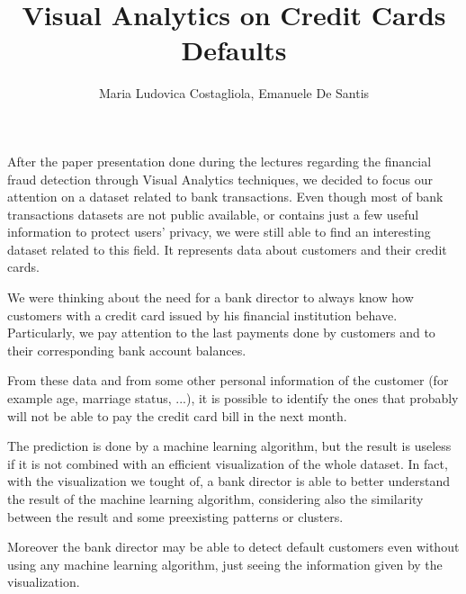 \documentclass[journal]{vgtc}                %
\title{Visual Analytics on Credit Cards Defaults}
\author{Maria Ludovica Costagliola, Emanuele De Santis}
\begin{document}


\maketitle


After the paper presentation done during the lectures regarding the financial
fraud detection through Visual Analytics techniques, we decided to
focus our attention on a dataset related to bank transactions.
Even though most of bank transactions datasets are not public available,
or contains just a few useful information to protect users’ privacy, we were still
able to find an interesting dataset related to this field. It represents
data about customers and their credit cards.

We were thinking about the need for a bank director to always know
how customers with a credit card issued by his financial institution
behave. Particularly, we pay attention to the last payments done by customers
and to their corresponding bank account balances.

From these data and from some other personal information of the customer (for example age, marriage status, ...), it is possible to identify the ones that probably will not be able
to pay the credit card bill in the next month.

The prediction is done by a machine learning algorithm, but the
result is useless if it is not combined with an efficient visualization
of the whole dataset. In fact, with the visualization we tought of,
a bank director is able to better understand the result of the machine
learning algorithm, considering also the similarity between the result
and some preexisting patterns or clusters.

Moreover the bank director may be able to detect default customers even without using any machine learning algorithm, just seeing the information given by the visualization.
\end{document}
